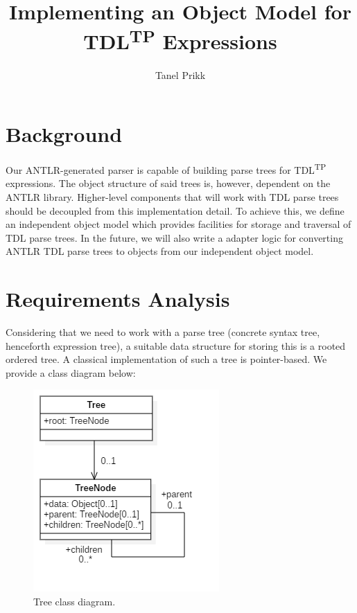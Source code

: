 \documentclass[12pt,oneside,a4paper,notitlepage]{report}
\title{
	Implementing an Object Model for TDL\textsuperscript{TP} Expressions
}
\author{Tanel Prikk}
\begin{document}
	\maketitle

	\section*{Background}
	\par Our ANTLR-generated parser is capable of building parse trees for TDL\textsuperscript{TP} expressions. The object structure of said trees is, however, dependent on the ANTLR library. Higher-level components that will work with TDL parse trees should be decoupled from this implementation detail. To achieve this, we define an independent object model which provides facilities for storage and traversal of TDL parse trees. In the future, we will also write a adapter logic for converting ANTLR TDL parse trees to objects from our independent object model.

	\newpage

	\section*{Requirements Analysis}
	\par Considering that we need to work with a parse tree (concrete syntax tree, henceforth expression tree), a suitable data structure for storing this is a rooted ordered tree. A classical implementation of such a tree is pointer-based. We provide a class diagram below:

	\begin{figure}[h]
		\begin{center}
		\includegraphics{Models/BasicTree}
		\end{center}
		\caption{Tree class diagram.}
		\label{fig:basic-tree}
	\end{figure}
\end{document}
